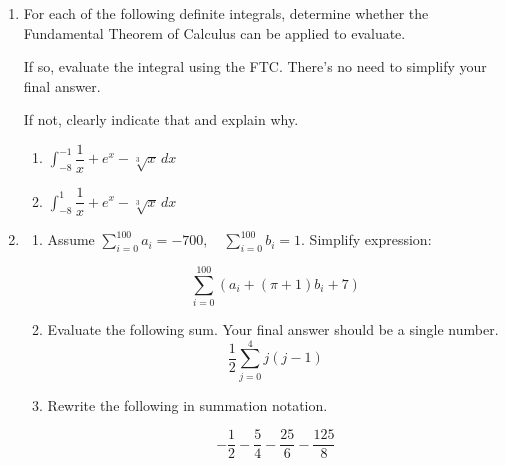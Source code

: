 \documentclass[11pt]{article}
\begin{document}
\begin{enumerate}
\item For each of the following definite integrals, determine whether the Fundamental Theorem of Calculus can be applied to evaluate. 

If so, evaluate the integral using the FTC. There's no need to simplify your final answer.

If not, clearly indicate that and explain why.

\begin{enumerate}
    \item $\displaystyle\int_{-8}^{-1}\dfrac{1}{x}+e^x-\sqrt[3]{x}\, dx$

    \vfill

    \item $\displaystyle\int_{-8}^1\dfrac{1}{x}+e^x-\sqrt[3]{x}\, dx$

    \vfill
\end{enumerate}

\newpage



\item \begin{enumerate}
    \item Assume $\sum\limits_{i=0}^{100} a_i = -700,\quad \sum\limits_{i=0}^{100} b_i=1$. Simplify expression:

    \[
        \sum_{i=0}^{100} (a_i + (\pi+1) b_i +7)
    \]
    \vfill
    \item Evaluate the following sum. Your final answer should be a single number.
    \[
    \frac{1}{2}\sum_{j=0}^{4} j(j-1)
    \]
    \vfill
    \item Rewrite the following in summation notation. 

    \[
        -\frac{1}{2} - \frac{5}{4}-\frac{25}{6}-\frac{125}{8}
    \]

    \vfill
\end{enumerate}


\newpage



\end{enumerate}
\end{document}
